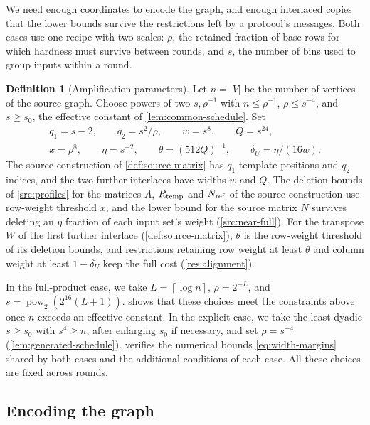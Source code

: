 \documentclass[11pt,letterpaper]{article} \usepackage[utf8]{inputenc}
\theoremstyle{plain} \newtheorem{theorem}{Theorem}[section]
\theoremstyle{definition} \newaliascnt{definition}{theorem}
\newtheorem{definition}[definition]{Definition} \aliascntresetthe{definition}
\newcommand{\ceil}[1]{\left\lceil#1\right\rceil}
\begin{document}
We need enough coordinates to encode the graph, and enough interlaced
copies that the lower bounds survive the restrictions left by a
protocol's messages. Both cases use one recipe with two scales: $\rho$, the retained
fraction of base rows for which hardness must survive between rounds, and
$s$, the number of bins used to group inputs within a round.

\begin{definition}[Amplification parameters]\label{def:amplification-parameters}
Let $n=|V|$ be the number of vertices of the source graph. Choose powers of two $s,\rho^{-1}$ with
$n\le\rho^{-1}$, $\rho\le s^{-4}$, and $s\ge s_0$, the effective constant
of \cref{lem:common-schedule}. Set
\[
\begin{gathered}
q_1=s-2,\qquad q_2=s^2/\rho,\qquad w=s^8,\qquad Q=s^{24},\\
x=\rho^8,\qquad \eta=s^{-2},\qquad
\theta=(512Q)^{-1},\qquad \delta_U=\eta/(16w).
\end{gathered}
\]
The source construction of \cref{def:source-matrix} has $q_1$ template
positions and $q_2$ indices, and the two further interlaces have widths
$w$ and $Q$. The deletion bounds of \cref{src:profiles} for the matrices
$A$, $R_{\rm temp}$ and $N_{\rm ref}$ of the source construction use
row-weight threshold $x$, and the lower bound for the source matrix $N$
survives deleting an $\eta$ fraction of each input set's weight
(\cref{src:near-full}). For the transpose $W$ of the first further interlace
(\cref{def:source-matrix}), $\theta$ is the row-weight threshold of its
deletion bounds, and restrictions retaining row weight at least $\theta$ and
column weight at least $1-\delta_U$ keep the full cost (\cref{res:alignment}).
\end{definition}

In the full-product case, we take $L=\ceil{\log n}$, $\rho=2^{-L}$, and
$s=\operatorname{pow}_2(2^{16}(L+1))$.  shows that
these choices meet the constraints above once $n$ exceeds an effective
constant. In the explicit case, we take the least dyadic $s\ge s_0$ with
$s^4\ge n$, after enlarging $s_0$ if necessary, and set $\rho=s^{-4}$
(\cref{lem:generated-schedule}).  verifies the
numerical bounds \eqref{eq:width-margins} shared by both cases and the
additional conditions of each case. All
these choices are fixed across rounds.

\subsection{Encoding the graph}
\end{document}
